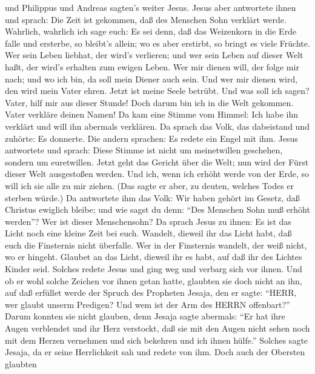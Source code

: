 und Philippus und Andreas sagten's weiter Jesus.  Jesus
aber antwortete ihnen und sprach: Die Zeit ist gekommen, daß des
Menschen Sohn verklärt werde.  Wahrlich, wahrlich ich sage
euch: Es sei denn, daß das Weizenkorn in die Erde falle und ersterbe, so
bleibt's allein; wo es aber erstirbt, so bringt es viele Früchte.
 Wer sein Leben liebhat, der wird's verlieren; und wer sein
Leben auf dieser Welt haßt, der wird's erhalten zum ewigen Leben.
 Wer mir dienen will, der folge mir nach; und wo ich bin,
da soll mein Diener auch sein. Und wer mir dienen wird, den wird mein
Vater ehren.  Jetzt ist meine Seele betrübt. Und was soll
ich sagen? Vater, hilf mir aus dieser Stunde! Doch darum bin ich in die
Welt gekommen.  Vater verkläre deinen Namen! Da kam eine
Stimme vom Himmel: Ich habe ihn verklärt und will ihn abermals
verklären.  Da sprach das Volk, das dabeistand und zuhörte:
Es donnerte. Die andern sprachen: Es redete ein Engel mit ihm.
 Jesus antwortete und sprach: Diese Stimme ist nicht um
meinetwillen geschehen, sondern um euretwillen.  Jetzt geht
das Gericht über die Welt; nun wird der Fürst dieser Welt ausgestoßen
werden.  Und ich, wenn ich erhöht werde von der Erde, so
will ich sie alle zu mir ziehen.  (Das sagte er aber, zu
deuten, welches Todes er sterben würde.)  Da antwortete ihm
das Volk: Wir haben gehört im Gesetz, daß Christus ewiglich bleibe; und
wie sagst du denn: ``Des Menschen Sohn muß erhöht werden''? Wer ist
dieser Menschensohn?  Da sprach Jesus zu ihnen: Es ist das
Licht noch eine kleine Zeit bei euch. Wandelt, dieweil ihr das Licht
habt, daß euch die Finsternis nicht überfalle. Wer in der Finsternis
wandelt, der weiß nicht, wo er hingeht.  Glaubet an das
Licht, dieweil ihr es habt, auf daß ihr des Lichtes Kinder seid.
 Solches redete Jesus und ging weg und verbarg sich vor
ihnen. Und ob er wohl solche Zeichen vor ihnen getan hatte, glaubten sie
doch nicht an ihn,  auf daß erfüllet werde der Spruch des
Propheten Jesaja, den er sagte: ``HERR, wer glaubt unserm Predigen? Und
wem ist der Arm des HERRN offenbart?''  Darum konnten sie
nicht glauben, denn Jesaja sagte abermals:  ``Er hat ihre
Augen verblendet und ihr Herz verstockt, daß sie mit den Augen nicht
sehen noch mit dem Herzen vernehmen und sich bekehren und ich ihnen
hülfe.''  Solches sagte Jesaja, da er seine Herrlichkeit
sah und redete von ihm.  Doch auch der Obersten glaubten
